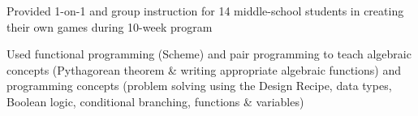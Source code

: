 \documentclass[letterpaper]{deedy-resume} %
\begin{document}
\begin{minipage}[t]{0.66\textwidth}
%
%



\begin{tightitemize}
\item Provided 1-on-1 and group instruction for 14 middle-school students in creating their own games during 10-week program 
\item Used functional programming (Scheme) and pair programming to teach algebraic concepts (Pythagorean theorem \& writing appropriate algebraic functions) and programming concepts (problem solving using the Design Recipe, data types, Boolean logic, conditional branching, functions \& variables)
\end{tightitemize}

\sectionspace %




\end{minipage}
\end{document}

